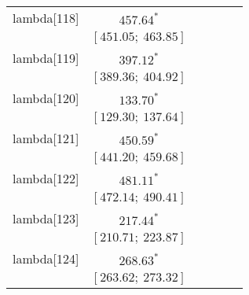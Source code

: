\begin{table}
\begin{center}
\begin{tabular}{l c c c c c }
lambda[118] & $457.64^{*}$                     &                           &                           &                         &                         \\
            & $[451.05;\ 463.85]$              &                           &                           &                         &                         \\
lambda[119] & $397.12^{*}$                     &                           &                           &                         &                         \\
            & $[389.36;\ 404.92]$              &                           &                           &                         &                         \\
lambda[120] & $133.70^{*}$                     &                           &                           &                         &                         \\
            & $[129.30;\ 137.64]$              &                           &                           &                         &                         \\
lambda[121] & $450.59^{*}$                     &                           &                           &                         &                         \\
            & $[441.20;\ 459.68]$              &                           &                           &                         &                         \\
lambda[122] & $481.11^{*}$                     &                           &                           &                         &                         \\
            & $[472.14;\ 490.41]$              &                           &                           &                         &                         \\
lambda[123] & $217.44^{*}$                     &                           &                           &                         &                         \\
            & $[210.71;\ 223.87]$              &                           &                           &                         &                         \\
lambda[124] & $268.63^{*}$                     &                           &                           &                         &                         \\
            & $[263.62;\ 273.32]$              &                           &                           &                         &                         \\

\end{tabular}
\end{center}
\end{table}
